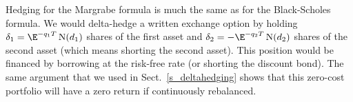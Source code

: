 \normalsize

Hedging for the Margrabe formula is much the same as for the Black-Scholes formula.  We would delta-hedge a  written exchange option by holding $\delta_1=\E^{-q_1T}\N(d_1)$ shares of the first asset and $\delta_2 =- \E^{-q_2T}\N(d_2)$ shares of the second asset (which means shorting the second asset).  This position would be financed by borrowing at the risk-free rate (or shorting the discount bond).  The same argument that we used in Sect.~\ref{s_deltahedging} shows that this zero-cost portfolio will have a zero return if continuously rebalanced.

